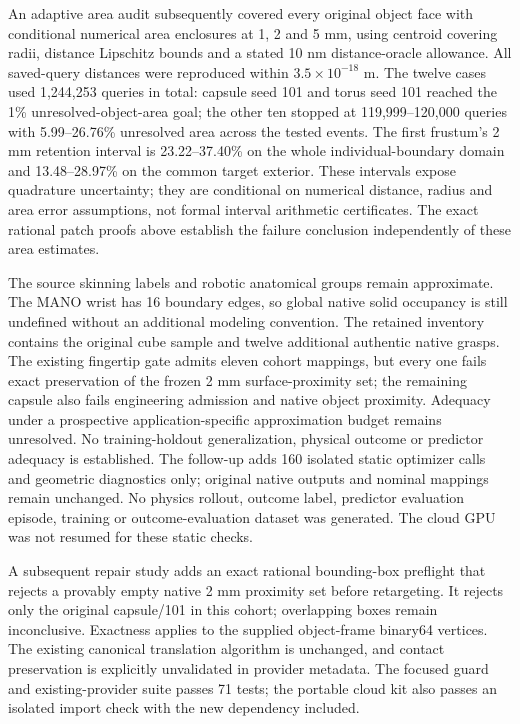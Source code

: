 \documentclass[10pt,letterpaper]{article}
\begin{document}
An adaptive area audit subsequently covered every original object face with
conditional numerical area enclosures at 1, 2 and 5 mm, using centroid covering
radii, distance Lipschitz bounds and a stated 10 nm distance-oracle allowance.
All saved-query distances were reproduced within $3.5\times10^{-18}$ m.
The twelve cases used 1,244,253 queries in total: capsule seed 101 and torus
seed 101 reached the 1\% unresolved-object-area goal; the other ten stopped at
119,999--120,000 queries with 5.99--26.76\% unresolved area across the tested
events. The first frustum's 2 mm retention interval is 23.22--37.40\% on the
whole individual-boundary domain and 13.48--28.97\% on the common target
exterior. These intervals expose quadrature uncertainty; they are conditional
on numerical distance, radius and area error assumptions, not formal interval
arithmetic certificates. The exact rational patch proofs above establish the
failure conclusion independently of these area estimates.

The source skinning labels and robotic anatomical groups remain approximate.
The MANO wrist has 16 boundary edges, so global native solid occupancy is still
undefined without an additional modeling convention. The retained inventory
contains the original cube sample and twelve additional authentic native
grasps. The existing fingertip gate admits eleven cohort mappings, but every
one fails exact preservation of the frozen 2 mm surface-proximity set; the
remaining capsule also fails engineering admission and native object proximity.
Adequacy under a prospective application-specific approximation budget remains
unresolved. No training-holdout generalization, physical outcome or predictor
adequacy is established. The follow-up adds 160 isolated static optimizer calls
and geometric diagnostics only; original native outputs and nominal mappings
remain unchanged. No physics rollout, outcome label, predictor evaluation
episode, training or outcome-evaluation dataset was generated. The cloud GPU
was not resumed for these static checks.

A subsequent repair study adds an exact rational bounding-box preflight that
rejects a provably empty native 2 mm proximity set before retargeting. It
rejects only the original capsule/101 in this cohort; overlapping boxes remain
inconclusive. Exactness applies to the supplied object-frame binary64 vertices.
The existing canonical translation algorithm is unchanged, and contact
preservation is explicitly unvalidated in provider metadata. The focused guard
and existing-provider suite passes 71 tests; the portable cloud kit also passes
an isolated import check with the new dependency included.
\end{document}
